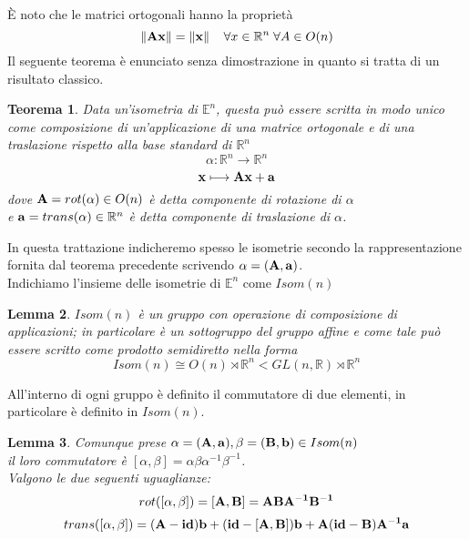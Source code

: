 \documentclass[a4paper,11pt,openright,twoside	]{book}
\newtheorem{theorem}{Teorema}[section]
\newtheorem{lemma}[theorem]{Lemma}
\begin{document}
\`E noto che le matrici ortogonali hanno la proprietà
\[ \norm{\vb{Ax}} = \norm{\vb{x}}   \; \; \; \; \forall x \in \mathbb{R}^n \; \forall A \in O(n)\]
Il seguente teorema è enunciato senza dimostrazione in quanto si tratta di un risultato classico. 
\begin{theorem}
Data un'isometria di $\mathbb{E}^n $, questa può essere scritta in modo unico come composizione di un'applicazione di una matrice ortogonale e di una traslazione rispetto alla base standard di $\mathbb{R}^n$
\[ \alpha : \mathbb{R}^{n} \longrightarrow \mathbb{R}^{n} \]
\[\vb{x} \longmapsto \vb{Ax + a} \]
dove $\vb{A} = rot( \alpha ) \in O(n) $ è detta componente di rotazione di $\alpha$ \\
e $\vb{a} = trans( \alpha ) \in \mathbb{R}^{n} $ è detta componente di traslazione di $\alpha$. 
\end{theorem}
In questa trattazione indicheremo spesso le isometrie secondo la rappresentazione fornita dal teorema precedente scrivendo $\alpha = ( \vb{A, a})  $. \\
Indichiamo l'insieme delle isometrie di  $\mathbb{E}^{n} $ come $Isom(n)$
\begin{lemma}
$Isom(n)$ è un gruppo con operazione di composizione di applicazioni; in particolare è un sottogruppo del gruppo affine e come tale può essere scritto come prodotto semidiretto nella forma
\[ Isom(n) \cong   O(n) \rtimes \mathbb{R}^{n} <  GL(n, \mathbb{R}) \rtimes\mathbb{R}^{n} 
\]
\end{lemma}
All'interno di ogni gruppo è definito il commutatore di due elementi, in particolare è definito in $Isom(n)$.
\begin{lemma}
\label{lemma:1}
	Comunque prese  $ \alpha = (\vb{A,a}), \beta = (\vb{B,b}) \in Isom(n)$\\
	il loro commutatore è  $ [ \alpha , \beta] = \alpha \beta \alpha^{-1} \beta^{-1}$. \\
Valgono le due seguenti uguaglianze:
\begin{equation}
rot([ \alpha	, \beta ]) = \vb{[A, B]} = \vb{ABA^{-1}B^{-1}}
\end{equation}  
\begin{equation}
trans([ \alpha	, \beta ]) = \vb{(A-id)b+(id-[A,B])b+A(id-B)A^{-1}a }
\end{equation} 
\end{lemma}
\end{document}
